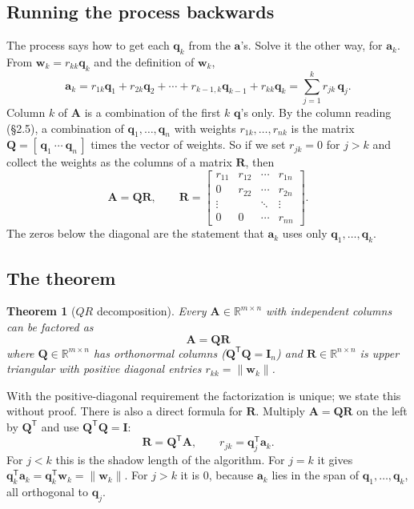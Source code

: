 \documentclass[11pt]{article}
\theoremstyle{plain}
\newtheorem{thm}{Theorem}[section]
\theoremstyle{definition}
\theoremstyle{remark}
\newcommand{\R}{\mathbb{R}}
\newcommand{\vc}[1]{\mathbf{#1}}
\newcommand{\mt}[1]{\mathbf{#1}}
\newcommand{\norm}[1]{\lVert #1\rVert}
\newcommand{\T}{^{\mathsf{T}}}
\begin{document}
\subsection{Running the process backwards}
The process says how to get each $\vc{q}_k$ from the $\vc{a}$'s. Solve it the other
way, for $\vc{a}_k$. From $\vc{w}_k=r_{kk}\vc{q}_k$ and the definition of
$\vc{w}_k$,
\[
  \vc{a}_k=r_{1k}\vc{q}_1+r_{2k}\vc{q}_2+\cdots+r_{k-1,k}\vc{q}_{k-1}+r_{kk}\vc{q}_k
  =\sum_{j=1}^{k}r_{jk}\,\vc{q}_j .
\]
Column $k$ of $\mt{A}$ is a combination of the first $k$ $\vc{q}$'s only. By the
column reading (\S2.5), a combination of $\vc{q}_1,\dots,\vc{q}_n$ with weights
$r_{1k},\dots,r_{nk}$ is the matrix $\mt{Q}=[\,\vc{q}_1\ \cdots\ \vc{q}_n\,]$ times
the vector of weights. So if we set $r_{jk}=0$ for $j>k$ and collect the weights
as the columns of a matrix $\mt{R}$, then
\[
  \mt{A}=\mt{Q}\mt{R},
  \qquad
  \mt{R}=\begin{bmatrix}r_{11}&r_{12}&\cdots&r_{1n}\\
                        0&r_{22}&\cdots&r_{2n}\\
                        \vdots&&\ddots&\vdots\\
                        0&0&\cdots&r_{nn}\end{bmatrix}.
\]
The zeros below the diagonal are the statement that $\vc{a}_k$ uses only
$\vc{q}_1,\dots,\vc{q}_k$.

\subsection{The theorem}
\begin{thm}[$QR$ decomposition]
\label{thm:qr}
Every $\mt{A}\in\R^{m\times n}$ with independent columns can be factored as
\[
  \boxed{\;\mt{A}=\mt{Q}\mt{R}\;}
\]
where $\mt{Q}\in\R^{m\times n}$ has orthonormal columns ($\mt{Q}\T\mt{Q}=\mt{I}_n$)
and $\mt{R}\in\R^{n\times n}$ is upper triangular with positive diagonal entries
$r_{kk}=\norm{\vc{w}_k}$.
\end{thm}

\noindent With the positive-diagonal requirement the factorization is unique; we
state this without proof. There is also a direct formula for $\mt{R}$. Multiply
$\mt{A}=\mt{Q}\mt{R}$ on the left by $\mt{Q}\T$ and use $\mt{Q}\T\mt{Q}=\mt{I}$:
\[
  \mt{R}=\mt{Q}\T\mt{A},\qquad r_{jk}=\vc{q}_j\T\vc{a}_k .
\]
For $j<k$ this is the shadow length of the algorithm. For $j=k$ it gives
$\vc{q}_k\T\vc{a}_k=\vc{q}_k\T\vc{w}_k=\norm{\vc{w}_k}$. For $j>k$ it is $0$,
because $\vc{a}_k$ lies in the span of $\vc{q}_1,\dots,\vc{q}_k$, all orthogonal to
$\vc{q}_j$.
\end{document}
